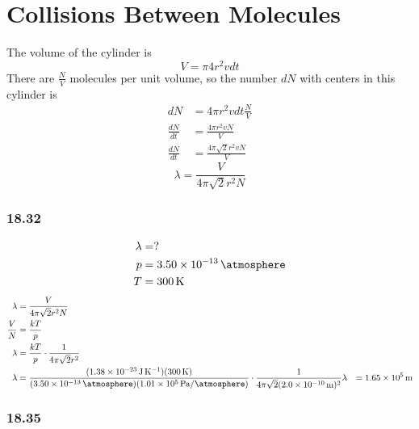 \documentclass{article}
\begin{document}
\section{Collisions Between Molecules}

The volume of the cylinder is
\begin{equation}
	V = \pi 4r^2 v dt
\end{equation}
There are $ \frac{ N }{ V } $ molecules per unit volume, so the number $ dN $ with centers in this cylinder is
\begin{align*}
	dN & = 4\pi r^2 v dt \frac{ N }{ V } \\
	\frac{ dN }{ dt } & = \frac{ 4\pi r^2 v N }{ V } \\
	\frac{ dN }{ dt } & = \frac{ 4\pi \sqrt{ 2 }r^2 v N }{ V }
\end{align*}
\begin{equation}
	\lambda = \frac{ V }{ 4\pi \sqrt{ 2 } r^2 N }
\end{equation}

\subsubsection{18.32}

\begin{align*}
	\lambda & = ? \\
	p & = \SI{3.50e-13}{\atmosphere} \\
	T & = \SI{300}{\kelvin}
\end{align*}
\begin{align*}
	\lambda & = \frac{ V }{ 4\pi \sqrt{2}r^2 N } \\
	\frac{ V }{ N } & = \frac{ kT }{ p } \\
	\lambda & = \frac{ kT }{ p } \cdot \frac{ 1 }{ 4\pi \sqrt{2}r^2 } \\
	\lambda & = \frac{ (\SI{1.38e-23}{\joule \per \kelvin})(\SI{300}{\kelvin}) }{ (\SI{3.50e-13}{\atmosphere})(\SI{1.01e5}{\pascal \per \atmosphere}) } \cdot \frac{ 1 }{ 4\pi \sqrt{2}(\SI{2.0e-10}{\meter})^2 }
	\lambda & = \SI{1.65e5}{\meter}
\end{align*}

\subsubsection{18.35}
\end{document}
